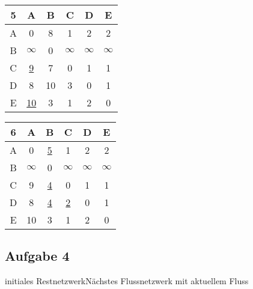 \documentclass[a4paper,graphics,11pt]{article}
\newcommand{\aufgabe}[1]{\subsection*{Aufgabe #1}}
\begin{document}
\begin{tabular}{c|c|c|c|c|c}
    5 & A & B & C & D & E\\
    \hline
    A & 0 & 8 & 1 & 2 & 2\\
    \hline
    B & $\infty$ & 0 & $\infty$ & $\infty$ & $\infty$\\
    \hline
    C & \underline{9} & 7 & 0 & 1 & 1\\
    \hline
    D & 8 & 10 & 3 & 0 & 1\\
    \hline
    E & \underline{10} & 3 & 1 & 2 & 0\\
\end{tabular}
\qquad
\begin{tabular}{c|c|c|c|c|c}
    6 & A & B & C & D & E\\
    \hline
    A & 0 & \underline{5} & 1 & 2 & 2\\
    \hline
    B & $\infty$ & 0 & $\infty$ & $\infty$ & $\infty$\\
    \hline
    C & 9 & \underline{4} & 0 & 1 & 1\\
    \hline
    D & 8 & \underline{4} & \underline{2} & 0 & 1\\
    \hline
    E & 10 & 3 & 1 & 2 & 0\\
\end{tabular}

\aufgabe{4}

initiales Restnetzwerk\hfill Nächstes Flussnetzwerk mit aktuellem Fluss
\end{document}
